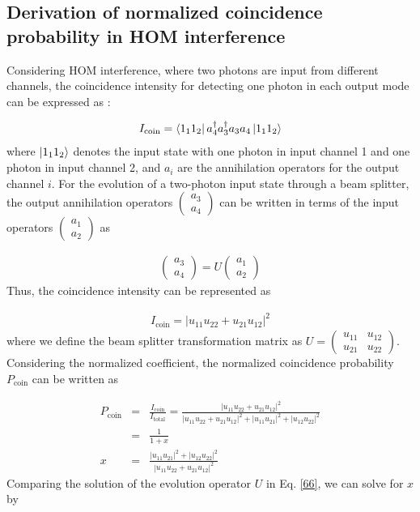 \documentclass[%
reprint,
superscriptaddress,
amsthm,amsmath,amssymb,
aps,
]{revtex4-1}
\begin{document}
\subsection{\label{sec:level52}Derivation of normalized coincidence probability in HOM interference}

Considering HOM interference, where two photons are input from different channels, the coincidence intensity for detecting one photon in each output mode can be expressed as \cite{scully1997quantum}:

\begin{eqnarray}
	I_{\text{coin}}=\bra{1_{1}1_{2}}a_{4}^{\dagger}a_{3}^{\dagger}a_{3}a_{4}\ket{1_{1}1_{2}}
\end{eqnarray}
where $\ket{1_{1}1_{2}}$ denotes the input state with one photon in input channel 1 and one photon in input channel 2, and $a_{i} $ are the annihilation operators for the output channel $i$. For the evolution of a two-photon input state through a beam splitter, the output annihilation operators $\begin{pmatrix}	a_{3} \\ a_{4}	\end{pmatrix}$ can be written in terms of the input operators  $\begin{pmatrix}	a_{1} \\ a_{2}	\end{pmatrix}$ as

\begin{eqnarray}
	\begin{pmatrix}	a_{3} \\ a_{4}	\end{pmatrix}=U\begin{pmatrix}	a_{1} \\ a_{2}	\end{pmatrix}
\end{eqnarray}
Thus, the coincidence intensity can be represented as

\begin{eqnarray}
	I_{\text{coin}}=\left| u_{11} u_{22} + u_{21} u_{12} \right|^2
\end{eqnarray}
where we define the beam splitter transformation matrix as $U= \begin{pmatrix} u_{11} & u_{12} \\	u_{21} & u_{22} \end{pmatrix}$. Considering the normalized coefficient, the normalized coincidence probability $P_{\text{coin}} $ can be written as

\begin{eqnarray}
	P_{\text{coin}}&=&\frac{I_{\text{coin}}}{I_{\text{total}}}=\frac{\left| u_{11} u_{22} + u_{21} u_{12} \right|^2}{
		\left| u_{11} u_{22} + u_{21} u_{12} \right|^2
		+ \left| u_{11} u_{21} \right|^2
		+ \left| u_{12} u_{22} \right|^2}\nonumber\\
	&=&\frac{1}{1+x} \nonumber\\
	x&=&\frac{ \left| u_{11} u_{21} \right|^2
		+ \left| u_{12} u_{22} \right|^2}{
		\left| u_{11} u_{22} + u_{21} u_{12} \right|^2}
\end{eqnarray}
Comparing the solution of the evolution operator $U$ in Eq. \ref{66}, we can solve for $x$ by
\end{document}
